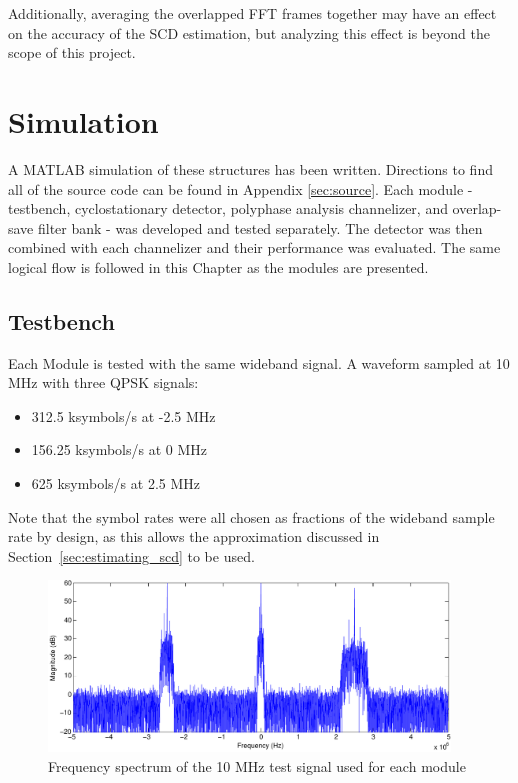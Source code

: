 \documentclass[12pt]{report}
\begin{document}
Additionally, averaging the overlapped FFT frames together may have an effect
on the accuracy of the SCD estimation, but analyzing this effect is beyond the
scope of this project.

\chapter{Simulation}
\label{sec:sim}
A MATLAB simulation of these structures has been written. Directions to find
all of the source code can be found in Appendix \ref{sec:source}. Each module
- testbench, cyclostationary detector, polyphase analysis channelizer, and
overlap-save filter bank - was developed and tested separately. The detector
was then combined with each channelizer and their performance was evaluated.
The same logical flow is followed in this Chapter as the modules are presented.

\section{Testbench}
Each Module is tested with the same wideband signal. A waveform sampled at 10 MHz with three QPSK signals:
\begin{itemize}
    \item{312.5 ksymbols/s at -2.5 MHz}
    \item{156.25 ksymbols/s at 0 MHz}
    \item{625 ksymbols/s at 2.5 MHz}
\end{itemize}
Note that the symbol rates were all chosen as fractions of the wideband sample
rate by design, as this allows the approximation discussed in
Section~\ref{sec:estimating_scd} to be used.

\begin{figure}[h]
    \begin{center}
        \includegraphics[width=0.95\textwidth]{test_signal}
    \end{center}
    \caption{Frequency spectrum of the 10 MHz test signal used for each module}
\end{figure}
\end{document}
